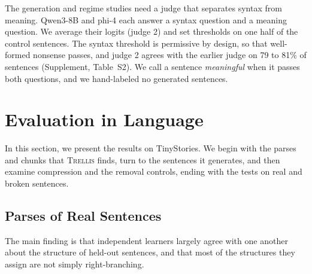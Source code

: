 \documentclass[11pt,letterpaper]{article}
\newcommand{\trellis}{\textsc{Trellis}}
\begin{document}
The generation and regime studies need a judge that separates syntax from meaning. Qwen3-8B \citep{qwen3} and phi-4 \citep{phi4} each answer a syntax question and a meaning question.
We average their logits (judge 2) and set thresholds on one half of the control sentences.
The syntax threshold is permissive by design, so that well-formed nonsense passes, and judge 2 agrees with the earlier judge on 79 to 81\% of sentences (Supplement, Table~S2).
We call a sentence \textit{meaningful} when it passes both questions, and we hand-labeled no generated sentences.

\section{Evaluation in Language}

In this section, we present the results on TinyStories. We begin with the parses and chunks that \trellis{} finds, turn to the sentences it generates, and then examine compression and the removal controls, ending with the tests on real and broken sentences.

\subsection{Parses of Real Sentences}

The main finding is that independent learners largely agree with one another about the structure of held-out sentences, and that most of the structures they assign are not simply right-branching.
\end{document}

